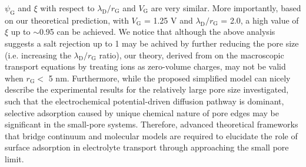 \documentclass[journal=nalefd,email=true, hyperref=true, keywords=false]{achemso}
\renewcommand*{\textcolor}[2]{#2}
\begin{document}
$\psi_{\mathrm{G}}$ and $\xi$ with respect to
$\lambda_{\mathrm{D}}/r_{\mathrm{G}}$ and $V_{\mathrm{G}}$ are very
similar. More importantly, based on our theoretical prediction, with
$V_{\mathrm{G}}$ = 1.25 V and $\lambda_{\mathrm{D}} / r_{\mathrm{G}}$
= { 2.0}, a high value of $\xi$ up to $\sim$0.95 can be achieved.  We
notice that although the above analysis suggests a salt rejection up
to 1 may be achived by further reducing the pore size (i.e. increasing
the $\lambda_{\mathrm{D}}/r_{\mathrm{G}}$ ratio), our theory, derived
from on the macroscopic transport equations by treating ions as
zero-volume charges, may not be valid when $r_{\mathrm{G}}<$ 5
nm\cite{Jain_2015}. \textcolor{blue}{ Furthermore, while the proposed
  simplified model can nicely describe the experimental results for
  the relatively large pore size investigated, such that the
  electrochemical potential-driven diffusion pathway is dominant,
  selective adsorption caused by unique chemical nature of pore edges
  may be significant in the small-pore systems. Therefore, advanced
  theoretical frameworks that bridge continuum and molecular models
  are required to elucidate the role of surface adsorption in
  electrolyte transport through approaching the small pore limit. }



\end{document}
